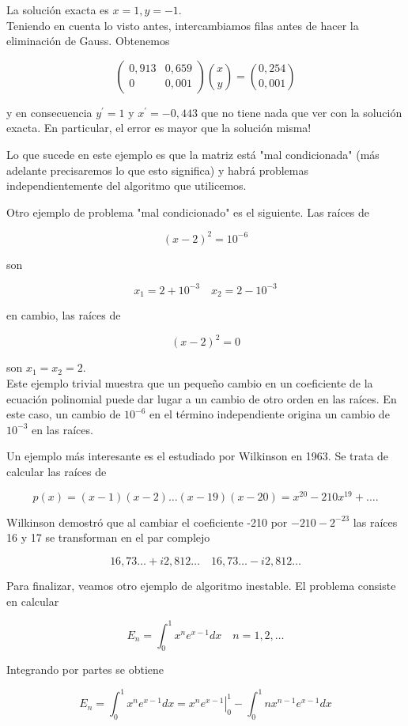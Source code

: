 \documentclass[10pt]{article}
\begin{document}
La solución exacta es $x=1, y=-1$.\\
Teniendo en cuenta lo visto antes, intercambiamos filas antes de hacer la eliminación de Gauss. Obtenemos

$$
\left(\begin{array}{cc}
0,913 & 0,659 \\
0 & 0,001
\end{array}\right)\binom{x}{y}=\binom{0,254}{0,001}
$$

y en consecuencia $y^{\prime}=1$ y $x^{\prime}=-0,443$ que no tiene nada que ver con la solución exacta. En particular, el error es mayor que la solución misma!

Lo que sucede en este ejemplo es que la matriz está "mal condicionada" (más adelante precisaremos lo que esto significa) y habrá problemas independientemente del algoritmo que utilicemos.

Otro ejemplo de problema "mal condicionado" es el siguiente. Las raíces de

$$
(x-2)^{2}=10^{-6}
$$

son

$$
x_{1}=2+10^{-3} \quad x_{2}=2-10^{-3}
$$

en cambio, las raíces de

$$
(x-2)^{2}=0
$$

son $x_{1}=x_{2}=2$.\\
Este ejemplo trivial muestra que un pequeño cambio en un coeficiente de la ecuación polinomial puede dar lugar a un cambio de otro orden en las raíces. En este caso, un cambio de $10^{-6}$ en el término independiente origina un cambio de $10^{-3}$ en las raíces.

Un ejemplo más interesante es el estudiado por Wilkinson en 1963. Se trata de calcular las raíces de

$$
p(x)=(x-1)(x-2) \ldots(x-19)(x-20)=x^{20}-210 x^{19}+\ldots .
$$

Wilkinson demostró que al cambiar el coeficiente -210 por $-210-2^{-23}$ las raíces 16 y 17 se transforman en el par complejo

$$
16,73 \ldots+i 2,812 \ldots \quad 16,73 \ldots-i 2,812 \ldots
$$

Para finalizar, veamos otro ejemplo de algoritmo inestable. El problema consiste en calcular

$$
E_{n}=\int_{0}^{1} x^{n} e^{x-1} d x \quad n=1,2, \ldots
$$

Integrando por partes se obtiene

$$
E_{n}=\int_{0}^{1} x^{n} e^{x-1} d x=\left.x^{n} e^{x-1}\right|_{0} ^{1}-\int_{0}^{1} n x^{n-1} e^{x-1} d x
$$
\end{document}
